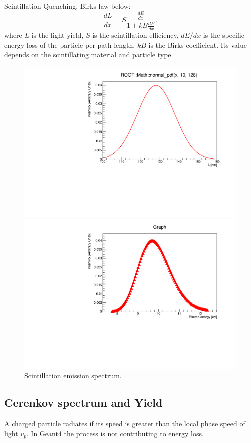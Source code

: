 \documentclass{article}
\begin{document}
  Scintillation Quenching,
  Birks law below:
\begin{equation}
  \frac {dL}{dx}=S\frac {\frac {dE}{dx}}{1+kB{\frac {dE}{dx}}}.
  \label{equ:birks}
\end{equation}
where $L$ is the light yield, $S$ is the scintillation efficiency, $dE/dx$ is the specific energy loss of the particle per path length, $kB$ is the Birks coefficient.
Its value depends on the scintillating material and particle type.
\begin{figure}
\centering
\begin{minipage}{.5\textwidth}
  \centering
  \includegraphics[width=.7\linewidth]{spectrum.pdf}
\end{minipage}%
\begin{minipage}{.5\textwidth}
  \centering
  \includegraphics[width=.7\linewidth]{spectrumE.pdf}
\end{minipage}
\caption{\label{fig:spectrum}Scintillation emission spectrum.}
\end{figure}

\subsection{Cerenkov spectrum and Yield}
A charged particle radiates if its speed is greater than the local phase speed of light $v_p$. 
In Geant4 the process is not contributing to energy loss.
\end{document}
